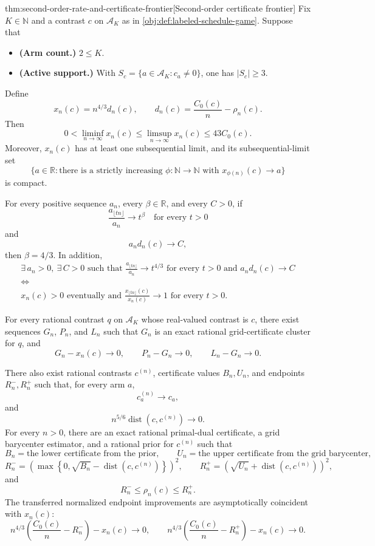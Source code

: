 \documentclass[11pt]{article}
\begin{document}
\begin{theoremv}{thm:second-order-rate-and-certificate-frontier}[Second-order certificate frontier]
Fix \(K\in\mathbb N\) and a contrast \(c\) on \(\mathcal A_K\) as in \cref{obj:def:labeled-schedule-game}.  Suppose that
\begin{itemize}
\item \textbf{(Arm count.)} \(2\le K\).
\item \textbf{(Active support.)} With \(S_c=\{a\in\mathcal A_K:c_a\ne0\}\), one has \(|S_c|\ge3\).
\end{itemize}
Define
\[
x_n(c)=n^{4/3}d_n(c),
\qquad
d_n(c)=\frac{C_0(c)}{n}-\rho_n(c).
\]
Then
\[
0<\liminf_{n\to\infty}x_n(c)
\le
\limsup_{n\to\infty}x_n(c)
\le
43C_0(c).
\]
Moreover, \(x_n(c)\) has at least one subsequential limit, and its subsequential-limit set
\[
\{a\in\mathbb R:\text{there is a strictly increasing }\phi:\mathbb N\to\mathbb N
\text{ with }x_{\phi(n)}(c)\to a\}
\]
is compact.

For every positive sequence \(a_n\), every \(\beta\in\mathbb R\), and every \(C>0\), if
\[
\frac{a_{\lfloor tn\rfloor}}{a_n}\to t^\beta
\quad\text{for every }t>0
\]
and
\[
a_n d_n(c)\to C,
\]
then \(\beta=4/3\).  In addition,
\[
\begin{gathered}
\exists\, a_n>0,\ \exists\, C>0
\text{ such that }
\frac{a_{\lfloor tn\rfloor}}{a_n}\to t^{4/3}
\text{ for every }t>0
\text{ and }a_n d_n(c)\to C
\\
\Longleftrightarrow
\\
x_n(c)>0\text{ eventually and }
\frac{x_{\lfloor tn\rfloor}(c)}{x_n(c)}\to1
\text{ for every }t>0 .
\end{gathered}
\]

For every rational contrast \(q\) on \(\mathcal A_K\) whose real-valued contrast is \(c\), there exist sequences \(G_n\), \(P_n\), and \(L_n\) such that \(G_n\) is an exact rational grid-certificate cluster for \(q\), and
\[
G_n-x_n(c)\to0,\qquad
P_n-G_n\to0,\qquad
L_n-G_n\to0.
\]

There also exist rational contrasts \(c^{(n)}\), certificate values \(B_n,U_n\), and endpoints \(R_n^-,R_n^+\) such that, for every arm \(a\),
\[
c_a^{(n)}\to c_a,
\]
and
\[
n^{5/6}\operatorname{dist}(c,c^{(n)})\to0.
\]
For every \(n>0\), there are an exact rational primal-dual certificate, a grid barycenter estimator, and a rational prior for \(c^{(n)}\) such that
\[
B_n=\text{the lower certificate from the prior},
\qquad
U_n=\text{the upper certificate from the grid barycenter},
\]
\[
R_n^-=
\left(\max\left\{0,\sqrt{B_n}-\operatorname{dist}(c,c^{(n)})\right\}\right)^2,
\qquad
R_n^+=
\left(\sqrt{U_n}+\operatorname{dist}(c,c^{(n)})\right)^2,
\]
and
\[
R_n^-\le \rho_n(c)\le R_n^+.
\]
The transferred normalized endpoint improvements are asymptotically coincident with \(x_n(c)\):
\[
n^{4/3}\left(\frac{C_0(c)}{n}-R_n^-\right)-x_n(c)\to0,
\qquad
n^{4/3}\left(\frac{C_0(c)}{n}-R_n^+\right)-x_n(c)\to0.
\]


\end{theoremv}
\end{document}
